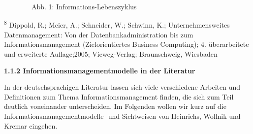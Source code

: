 \documentclass[a4paper]{article}
\begin{document}
\bigskip


\bigskip


\bigskip


\bigskip


\bigskip


\bigskip


\bigskip


\bigskip


\bigskip


\bigskip


\bigskip


\bigskip


\bigskip


\bigskip


\bigskip


\bigskip


\bigskip


\bigskip


\bigskip


\bigskip


\bigskip

{\sffamily\color{black}
\textrm{\ \ \ \ \ \ \ \ }Abb. 1: Informations-Lebenszyklus}


\bigskip


\bigskip


\bigskip


\bigskip


\bigskip


\bigskip


\bigskip


\bigskip


\bigskip


\bigskip

{\sffamily\color{black}
\textsuperscript{8 }Dippold, R.; Meier, A.; Schneider, W.; Schwinn, K.; Unternehmensweites Datenmanagement: Von der
Datenbankadministration bis zum Informationsmanagement (Zielorientiertes Business Computing); 4. überarbeitete und
erweiterte Auflage;2005; Vieweg-Verlag; Braunschweig, Wiesbaden }

{\sffamily\bfseries\color{black}
1.1.2 Informationsmanagementmodelle in der Literatur}

{\sffamily\color{black}
\newline
In der deutschsprachigen Literatur lassen sich viele verschiedene Arbeiten und Definitionen zum Thema
Informationsmanagement finden, die sich zum Teil deutlich voneinander unterscheiden. Im Folgenden wollen wir kurz auf
die Informationsmanagementmodelle- und Sichtweisen von Heinrichs, Wollnik und Krcmar eingehen.}
\end{document}

